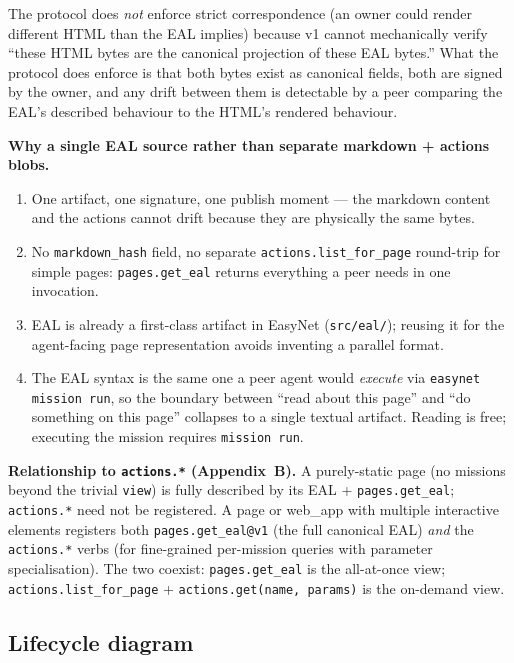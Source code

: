 \documentclass[11pt,a4paper]{article}
\theoremstyle{definition}
\begin{document}
The protocol does \emph{not} enforce strict correspondence
(an owner could render different HTML than the EAL implies)
because v1 cannot mechanically verify ``these HTML bytes are
the canonical projection of these EAL bytes.'' What the
protocol does enforce is that both bytes exist as canonical
fields, both are signed by the owner, and any drift between
them is detectable by a peer comparing the EAL's described
behaviour to the HTML's rendered behaviour.

\textbf{Why a single EAL source rather than separate
markdown + actions blobs.}

\begin{enumerate}[leftmargin=2em,itemsep=0.15em]
    \item One artifact, one signature, one publish moment ---
    the markdown content and the actions cannot drift because
    they are physically the same bytes.
    \item No \texttt{markdown\_hash} field, no separate
    \texttt{actions.list\_for\_page} round-trip for simple
    pages: \texttt{pages.get\_eal} returns everything a peer
    needs in one invocation.
    \item EAL is already a first-class artifact in EasyNet
    (\texttt{src/eal/}); reusing it for the agent-facing page
    representation avoids inventing a parallel format.
    \item The EAL syntax is the same one a peer agent would
    \emph{execute} via \texttt{easynet mission run}, so the
    boundary between ``read about this page'' and ``do
    something on this page'' collapses to a single textual
    artifact. Reading is free; executing the mission requires
    \texttt{mission run}.
\end{enumerate}

\textbf{Relationship to \texttt{actions.*} (Appendix~B).} A
purely-static page (no missions beyond the trivial
\texttt{view}) is fully described by its EAL +
\texttt{pages.get\_eal}; \texttt{actions.*} need not be
registered. A page or web\_app with multiple interactive
elements registers both \texttt{pages.get\_eal@v1} (the full
canonical EAL) \emph{and} the \texttt{actions.*} verbs (for
fine-grained per-mission queries with parameter
specialisation). The two coexist: \texttt{pages.get\_eal}
is the all-at-once view; \texttt{actions.list\_for\_page} +
\texttt{actions.get(name, params)} is the on-demand view.

\subsection{Lifecycle diagram}
\end{document}

